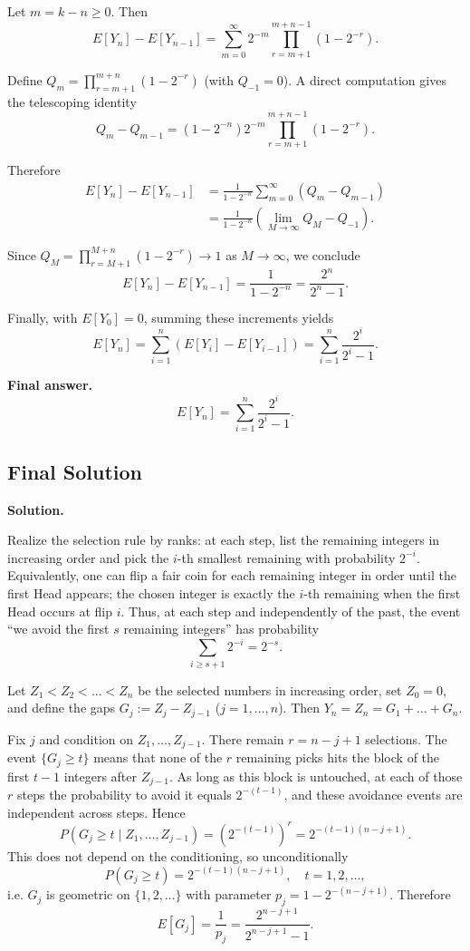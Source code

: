 \documentclass[12pt,a4paper]{article}
\theoremstyle{definition}
\begin{document}
    Let $m = k - n \geq 0$. Then
    \[E[Y_n] - E[Y_{n-1}] = \sum_{m=0}^{\infty} 2^{-m} \prod_{r=m+1}^{m+n-1} (1 - 2^{-r}).\]

    Define $Q_m = \prod_{r=m+1}^{m+n} (1 - 2^{-r})$ (with $Q_{-1} = 0$). A direct computation gives the telescoping identity
    \[Q_m - Q_{m-1} = (1 - 2^{-n}) 2^{-m} \prod_{r=m+1}^{m+n-1} (1 - 2^{-r}).\]

    Therefore
    \begin{align}
        E[Y_n] - E[Y_{n-1}] &= \frac{1}{1 - 2^{-n}} \sum_{m=0}^{\infty} (Q_m - Q_{m-1})\\
        &= \frac{1}{1 - 2^{-n}} \left(\lim_{M\to\infty} Q_M - Q_{-1}\right).
    \end{align}

    Since $Q_M = \prod_{r=M+1}^{M+n} (1 - 2^{-r}) \to 1$ as $M \to \infty$, we conclude
    \[E[Y_n] - E[Y_{n-1}] = \frac{1}{1 - 2^{-n}} = \frac{2^n}{2^n - 1}.\]

    Finally, with $E[Y_0] = 0$, summing these increments yields
    \[E[Y_n] = \sum_{i=1}^{n} (E[Y_i] - E[Y_{i-1}]) = \sum_{i=1}^{n} \frac{2^i}{2^i - 1}.\]

    \textbf{Final answer.}
    \[E[Y_n] = \sum_{i=1}^{n} \frac{2^i}{2^i - 1}.\]

    \subsection{Final Solution}
    \textbf{Solution.}

    Realize the selection rule by ranks: at each step, list the remaining integers in increasing order and pick the $i$-th smallest remaining with probability $2^{-i}$. Equivalently, one can flip a fair coin for each remaining integer in order until the first Head appears; the chosen integer is exactly the $i$-th remaining when the first Head occurs at flip $i$. Thus, at each step and independently of the past, the event ``we avoid the first $s$ remaining integers'' has probability
    $$\sum_{i \geq s+1} 2^{-i} = 2^{-s}.$$

    Let $Z_1 < Z_2 < \ldots < Z_n$ be the selected numbers in increasing order, set $Z_0=0$, and define the gaps $G_j := Z_j - Z_{j-1}$ ($j=1,\ldots,n$). Then $Y_n = Z_n = G_1 + \ldots + G_n$.

    Fix $j$ and condition on $Z_1,\ldots,Z_{j-1}$. There remain $r = n - j + 1$ selections. The event $\{G_j \geq t\}$ means that none of the $r$ remaining picks hits the block of the first $t-1$ integers after $Z_{j-1}$. As long as this block is untouched, at each of those $r$ steps the probability to avoid it equals $2^{-(t-1)}$, and these avoidance events are independent across steps. Hence
    $$P(G_j \geq t \mid Z_1,\ldots,Z_{j-1}) = (2^{-(t-1)})^r = 2^{-(t-1)(n-j+1)}.$$
    This does not depend on the conditioning, so unconditionally
    $$P(G_j \geq t) = 2^{-(t-1)(n-j+1)}, \quad t=1,2,\ldots,$$
    i.e. $G_j$ is geometric on $\{1,2,\ldots\}$ with parameter $p_j = 1 - 2^{-(n-j+1)}$. Therefore
    $$E[G_j] = \frac{1}{p_j} = \frac{2^{n-j+1}}{2^{n-j+1} - 1}.$$
\end{document}

